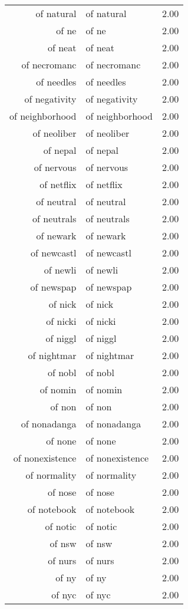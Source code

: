 \begin{table}[ht]
\begin{tabular}{rlr}
  of natural & of natural & 2.00 \\ 
  of ne & of ne & 2.00 \\ 
  of neat & of neat & 2.00 \\ 
  of necromanc & of necromanc & 2.00 \\ 
  of needles & of needles & 2.00 \\ 
  of negativity & of negativity & 2.00 \\ 
  of neighborhood & of neighborhood & 2.00 \\ 
  of neoliber & of neoliber & 2.00 \\ 
  of nepal & of nepal & 2.00 \\ 
  of nervous & of nervous & 2.00 \\ 
  of netflix & of netflix & 2.00 \\ 
  of neutral & of neutral & 2.00 \\ 
  of neutrals & of neutrals & 2.00 \\ 
  of newark & of newark & 2.00 \\ 
  of newcastl & of newcastl & 2.00 \\ 
  of newli & of newli & 2.00 \\ 
  of newspap & of newspap & 2.00 \\ 
  of nick & of nick & 2.00 \\ 
  of nicki & of nicki & 2.00 \\ 
  of niggl & of niggl & 2.00 \\ 
  of nightmar & of nightmar & 2.00 \\ 
  of nobl & of nobl & 2.00 \\ 
  of nomin & of nomin & 2.00 \\ 
  of non & of non & 2.00 \\ 
  of nonadanga & of nonadanga & 2.00 \\ 
  of none & of none & 2.00 \\ 
  of nonexistence & of nonexistence & 2.00 \\ 
  of normality & of normality & 2.00 \\ 
  of nose & of nose & 2.00 \\ 
  of notebook & of notebook & 2.00 \\ 
  of notic & of notic & 2.00 \\ 
  of nsw & of nsw & 2.00 \\ 
  of nurs & of nurs & 2.00 \\ 
  of ny & of ny & 2.00 \\ 
  of nyc & of nyc & 2.00 \\ 

\end{tabular}
\end{table}
